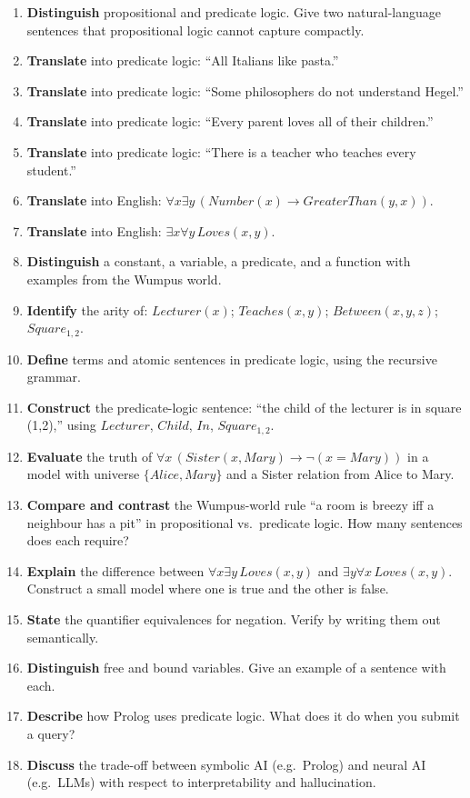 \documentclass[11pt, a4paper]{article}
\begin{document}
\begin{enumerate}
  \item \textbf{Distinguish} propositional and predicate logic. Give two natural-language sentences that propositional logic cannot capture compactly.
  \item \textbf{Translate} into predicate logic: ``All Italians like pasta.''
  \item \textbf{Translate} into predicate logic: ``Some philosophers do not understand Hegel.''
  \item \textbf{Translate} into predicate logic: ``Every parent loves all of their children.''
  \item \textbf{Translate} into predicate logic: ``There is a teacher who teaches every student.''
  \item \textbf{Translate} into English: $\forall x \exists y \, (Number(x) \rightarrow GreaterThan(y, x))$.
  \item \textbf{Translate} into English: $\exists x \forall y \, Loves(x, y)$.
  \item \textbf{Distinguish} a constant, a variable, a predicate, and a function with examples from the Wumpus world.
  \item \textbf{Identify} the arity of: $Lecturer(x)$; $Teaches(x, y)$; $Between(x, y, z)$; $Square_{1,2}$.
  \item \textbf{Define} terms and atomic sentences in predicate logic, using the recursive grammar.
  \item \textbf{Construct} the predicate-logic sentence: ``the child of the lecturer is in square (1,2),'' using $Lecturer$, $Child$, $In$, $Square_{1,2}$.
  \item \textbf{Evaluate} the truth of $\forall x \, (Sister(x, Mary) \rightarrow \neg(x = Mary))$ in a model with universe $\{Alice, Mary\}$ and a Sister relation from Alice to Mary.
  \item \textbf{Compare and contrast} the Wumpus-world rule ``a room is breezy iff a neighbour has a pit'' in propositional vs.\ predicate logic. How many sentences does each require?
  \item \textbf{Explain} the difference between $\forall x \exists y \, Loves(x, y)$ and $\exists y \forall x \, Loves(x, y)$. Construct a small model where one is true and the other is false.
  \item \textbf{State} the quantifier equivalences for negation. Verify by writing them out semantically.
  \item \textbf{Distinguish} free and bound variables. Give an example of a sentence with each.
  \item \textbf{Describe} how Prolog uses predicate logic. What does it do when you submit a query?
  \item \textbf{Discuss} the trade-off between symbolic AI (e.g.\ Prolog) and neural AI (e.g.\ LLMs) with respect to interpretability and hallucination.
\end{enumerate}
\end{document}
